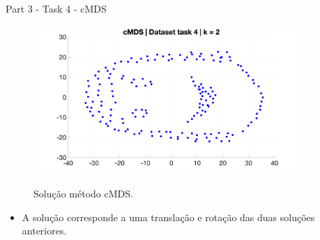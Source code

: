 \documentclass{beamer}					%
\begin{document}
\begin{frame}{Part 3 - Task 4 - cMDS}
	\begin{figure}[ht]
		
			\centering
			\includegraphics[width=0.9\textwidth]{figures/task4_extra_sol.png}
			\label{fig:task4_LM}
		\caption{Solução método cMDS.}
	\end{figure}
	\begin{itemize}
		\item A solução corresponde a uma translação e rotação das duas soluções anteriores.
	\end{itemize}
\end{frame}

\end{document}
